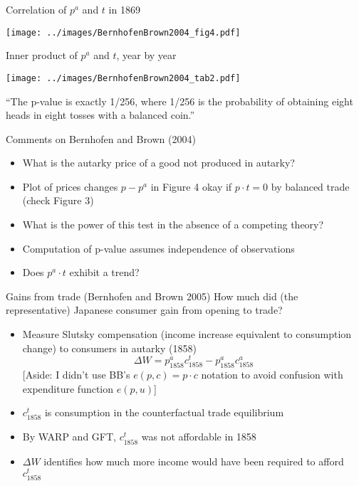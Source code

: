 \documentclass[10pt,notes=hide]{beamer}
\begin{document}
\begin{frame}{Correlation of $p^{a}$ and $t$ in 1869}
\begin{center}\texttt{[image: ../images/BernhofenBrown2004\_fig4.pdf]}\end{center}
\end{frame}
\begin{frame}{Inner product of $p^a$ and $t$, year by year}
\begin{center}\texttt{[image: ../images/BernhofenBrown2004\_tab2.pdf]}\end{center}
{\small ``The p-value is exactly 1/256, where 1/256 is the probability of obtaining eight heads in eight tosses with a balanced coin.''\par}
\end{frame}
\begin{frame}{Comments on Bernhofen and Brown (2004)}
\begin{itemize}
	\item What is the autarky price of a good not produced in autarky?
	\item Plot of prices changes $p-p^{a}$ in Figure 4 okay if $p\cdot t = 0$ by balanced trade (check Figure 3)
	\item What is the power of this test in the absence of a competing theory?
	\item Computation of p-value assumes independence of observations
	\item Does $p^a \cdot t$ exhibit a trend?
\end{itemize}
\end{frame}
\begin{frame}{Gains from trade (Bernhofen and Brown 2005)}
How much did (the representative) Japanese consumer gain from opening to trade?
\begin{itemize}
	\item Measure Slutsky compensation (income increase equivalent to consumption change) to consumers in autarky (1858)
	\begin{equation*}
		\Delta W = p^a_{\text{1858}} c^t_{\text{1858}} - p^a_{\text{1858}} c^a_{\text{1858}}
	\end{equation*}
	[Aside: I didn't use BB's $e(p,c)=p\cdot c$ notation to avoid confusion with expenditure function $e(p,u)$]
	\item $c^t_{\text{1858}}$ is consumption in the counterfactual trade equilibrium
	\item By WARP and GFT, $c^t_{\text{1858}}$ was not affordable in 1858
	\item $\Delta W$ identifies how much more income would have been required to afford $c^t_{\text{1858}}$
\end{itemize}
\end{frame}
\end{document}

